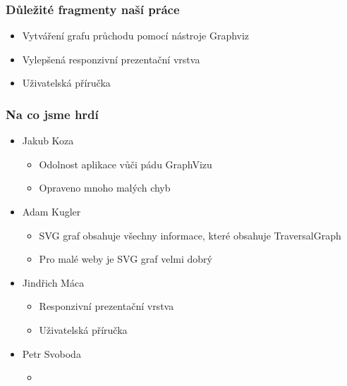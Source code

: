 \documentclass{beamer}
\begin{document}
\begin{frame}[allowframebreaks]\frametitle{Důležité fragmenty naší práce}
  \begin{itemize}
    \item Vytváření grafu průchodu pomocí nástroje Graphviz
		\item Vylepšená responzivní prezentační vrstva
		\item Uživatelská příručka
  \end{itemize}
\end{frame}

\begin{frame}[allowframebreaks]\frametitle{Na co jsme hrdí} 
  \begin{itemize}
    \item Jakub Koza
      \begin{itemize}
       \item Odolnost aplikace vůči pádu GraphVizu
       \item Opraveno mnoho malých chyb
     \end{itemize}
   
    \item Adam Kugler
      \begin{itemize}
       \item SVG graf obsahuje všechny informace, které obsahuje TraversalGraph
       \item Pro malé weby je SVG graf velmi dobrý
     \end{itemize}

    \item Jindřich Máca
      \begin{itemize}
       \item Responzivní prezentační vrstva
			 \item Uživatelská příručka
      \end{itemize}  
   
    \item Petr Svoboda
      \begin{itemize}
       \item 
     \end{itemize}
   \end{itemize}  
\end{frame}
\end{document}
